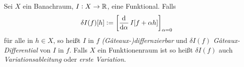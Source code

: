 \begin{definition}[Funktionalableitung] 
Sei $X$ ein Banachraum, $I:X\to \mathbb{R}$, eine Funktional. Falls 
\begin{equation}
\delta I(f)[h]:=\left[\dod{}{\alpha}I[f+\alpha
h]\right]_{\alpha=0}\label{eq:varderdef}
\end{equation}
für alle in $h\in X$, so heißt $I$ in $f$ \emph{(Gâteaux-)differnzierbar} und
$\delta I(f)$ \emph{Gâteaux-Differential} von $I$ in $f$. Falls $X$ ein
Funktionenraum ist so heißt $\delta I(f)$ auch \emph{Variationsableitung} oder
\emph{erste Variation}.
% 
\end{definition}
